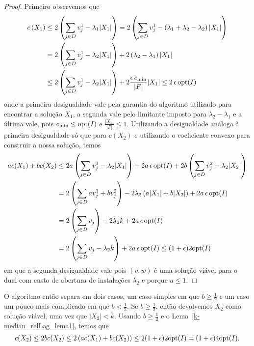 \begin{proof}
Primeiro observemos que 
\begin{subequations}
    \begin{align*}
        c\left(X_1\right) &\leq 2\left(\sum_{j \in D} v_j^1 - \lambda_1|X_1|\right) = 2\left(\sum_{j\in D} v_j^1 - \left( \lambda_1 + \lambda_2 - \lambda_2 \right)|X_1|\right)\\
        & = 2 \left(\sum_{j \in D} v_j^1 - \lambda_2 |X_1| \right) + 2 \left(\lambda_2 - \lambda_1\right) |X_1| \\
        &\leq 2 \left(\sum_{j \in D} v_j^1 - \lambda_2 |X_1| \right) + 2\frac{\epsilon\, c_{\min}}{|F|}|X_1| \leq 2 \, \epsilon \, \mathrm{opt}(I)
    \end{align*}
\end{subequations}
onde a primeira desigualdade vale pela garantia do algoritmo utilizado para encontrar a solução $X_1$, a segunda vale pelo limitante imposto para $\lambda_2 - \lambda_1$ e a última vale, pois $c_{\min} \leq \mathrm{opt}(I)$ e $\frac{|X_1|}{|F|} \leq 1$. Utilizando a desigualdade análoga à primeira desigualdade só que para $c(X_2)$ e utilizando o coeficiente convexo para construir a nossa solução, temos
\begin{subequations}
    \begin{align*}
        ac(X_1) + b c(X_2) &\leq 2a \left(\sum_{j\in D} v_j^1 - \lambda_2|X_1|\right) + 2a\, \epsilon\,\mathrm{opt}(I) + 2b\left(\sum_{j\in D} v_j^2 - \lambda_2|X_2|\right) \\
        &= 2\left(\sum_{j \in D} a v_j^1 + b v_j^2\right) - 2\lambda_2\left( a|X_1| + b|X_2|\right) + 2a\,\epsilon\,\mathrm{opt}(I)\\
        & = 2\left(\sum_{j\in D } v_j\right) - 2\lambda_2 k + 2a\,\epsilon\,\mathrm{opt}(I)\\
        & = 2\left( \sum_{j \in D } v_j -\lambda_2 k\right) + 2a\,\epsilon\,\mathrm{opt}(I) \leq (1+\epsilon)2\mathrm{opt}(I)
    \end{align*}
\end{subequations}
em que a segunda desigualdade vale pois $(v,w)$ é uma solução viável para o dual com custo de abertura de instalações $\lambda_2$ e porque $a \leq 1$.
\end{proof}

O algoritmo então separa em dois casos, um caso simples em que $b \geq \frac{1}{2}$ e um caso um pouco mais complicado em que $b < \frac{1}{2}$. Se $b \geq \frac{1}{2}$, então devolvemos $X_2$ como solução viável, uma vez que $|X_2| < k$. Usando $b \geq \frac{1}{2}$ e o Lema~\ref{k-median_relLag_lema1}, temos que
\begin{subequations}
    \begin{align*}
        c(X_2) \leq 2bc(X_2) \leq 2\left(ac(X_1) + bc(X_2) \right) \leq 2(1+\epsilon) 2\mathrm{opt}(I) = (1+\epsilon)4\mathrm{opt}(I).
    \end{align*}
\end{subequations}

